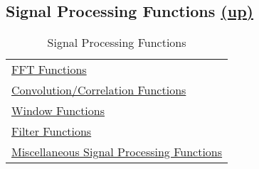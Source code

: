 \subsection*{Signal Processing Functions \hspace*{\fill}\hyperlink{VSIPspecHead}{(up)}\hypertarget{SignalProcessing}{}}
\begin{table}[H]
\hypertarget{vsiplSignalProcessing}{}
\caption{Signal Processing Functions}
\label{tab:SignalProcessing}
\begin{center}
\begin{tabular}{|l|}\hline
\hyperlink{fftFunctions}{FFT Functions}\\
\hyperlink{convCorrFunctions}{Convolution/Correlation Functions}\\
\hyperlink{windowFunctions}{Window Functions}\\
\hyperlink{filterFunctions}{Filter Functions}\\
\hyperlink{miscSigProcFunctions}{Miscellaneous Signal Processing Functions}\\
\hline\end{tabular}
\end{center}
\label{default}
\end{table}%
      
      
      
      
      